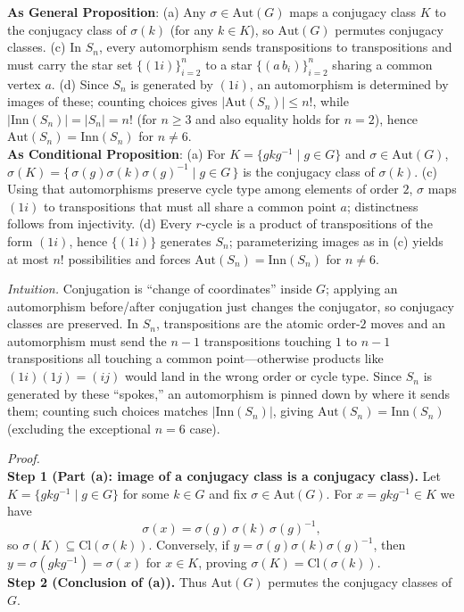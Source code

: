 \documentclass[11pt]{article}
\theoremstyle{definition}
\newcommand{\Aut}{\mathrm{Aut}}
\newcommand{\Inn}{\mathrm{Inn}}
\newcommand{\Cl}{\mathrm{Cl}}
\begin{document}
\noindent\textbf{As General Proposition}: (a) Any $\sigma\in\Aut(G)$ maps a conjugacy class $K$ to the conjugacy class of $\sigma(k)$ (for any $k\in K$), so $\Aut(G)$ permutes conjugacy classes. (c) In $S_n$, every automorphism sends transpositions to transpositions and must carry the star set $\{(1i)\}_{i=2}^n$ to a star $\{(a\,b_i)\}_{i=2}^n$ sharing a common vertex $a$. (d) Since $S_n$ is generated by $(1i)$, an automorphism is determined by images of these; counting choices gives $|\Aut(S_n)|\le n!$, while $|\Inn(S_n)|=|S_n|=n!$ (for $n\ge 3$ and also equality holds for $n=2$), hence $\Aut(S_n)=\Inn(S_n)$ for $n\ne 6$.\\

\noindent\textbf{As Conditional Proposition}: (a) For $K=\{gkg^{-1}\mid g\in G\}$ and $\sigma\in\Aut(G)$, $\sigma(K)=\{\,\sigma(g)\sigma(k)\sigma(g)^{-1}\mid g\in G\,\}$ is the conjugacy class of $\sigma(k)$. (c) Using that automorphisms preserve cycle type among elements of order $2$, $\sigma$ maps $(1i)$ to transpositions that must all share a common point $a$; distinctness follows from injectivity. (d) Every $r$-cycle is a product of transpositions of the form $(1i)$, hence $\{(1i)\}$ generates $S_n$; parameterizing images as in (c) yields at most $n!$ possibilities and forces $\Aut(S_n)=\Inn(S_n)$ for $n\ne 6$.\\

\newpage

\dotfill

\emph{Intuition.} Conjugation is “change of coordinates” inside $G$; applying an automorphism before/after conjugation just changes the conjugator, so conjugacy classes are preserved. In $S_n$, transpositions are the atomic order-$2$ moves and an automorphism must send the $n-1$ transpositions touching $1$ to $n-1$ transpositions all touching a common point—otherwise products like $(1i)(1j)=(ij)$ would land in the wrong order or cycle type. Since $S_n$ is generated by these “spokes,” an automorphism is pinned down by where it sends them; counting such choices matches $|\Inn(S_n)|$, giving $\Aut(S_n)=\Inn(S_n)$ (excluding the exceptional $n=6$ case).\\

\dotfill

\emph{Proof.}\\
\textbf{Step 1 (Part (a): image of a conjugacy class is a conjugacy class).} Let $K=\{gkg^{-1}\mid g\in G\}$ for some $k\in G$ and fix $\sigma\in\Aut(G)$. For $x=gkg^{-1}\in K$ we have
\[
\sigma(x)=\sigma(g)\,\sigma(k)\,\sigma(g)^{-1},
\]
so $\sigma(K)\subseteq \Cl(\sigma(k))$. Conversely, if $y=\sigma(g)\sigma(k)\sigma(g)^{-1}$, then $y=\sigma(gkg^{-1})=\sigma(x)$ for $x\in K$, proving $\sigma(K)=\Cl(\sigma(k))$.\\
\textbf{Step 2 (Conclusion of (a)).} Thus $\Aut(G)$ permutes the conjugacy classes of $G$.\\
\end{document}
